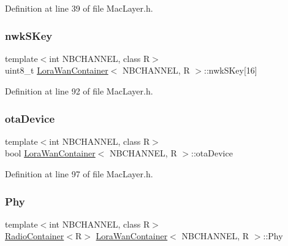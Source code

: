 Definition at line 39 of file Mac\+Layer.\+h.

\mbox{\label{class_lora_wan_container_a93c94009fe081053ce73e0b10e05625b}} 
\subsubsection{\texorpdfstring{nwk\+S\+Key}{nwkSKey}}
{\footnotesize\ttfamily template$<$int N\+B\+C\+H\+A\+N\+N\+EL, class R$>$ \\
uint8\+\_\+t \mbox{\hyperlink{class_lora_wan_container}{Lora\+Wan\+Container}}$<$ N\+B\+C\+H\+A\+N\+N\+EL, R $>$\+::nwk\+S\+Key\mbox{[}16\mbox{]}}



Definition at line 92 of file Mac\+Layer.\+h.

\mbox{\label{class_lora_wan_container_a41cc43d7525d3c7fca17d06261d3f1f3}} 
\subsubsection{\texorpdfstring{ota\+Device}{otaDevice}}
{\footnotesize\ttfamily template$<$int N\+B\+C\+H\+A\+N\+N\+EL, class R$>$ \\
bool \mbox{\hyperlink{class_lora_wan_container}{Lora\+Wan\+Container}}$<$ N\+B\+C\+H\+A\+N\+N\+EL, R $>$\+::ota\+Device}



Definition at line 97 of file Mac\+Layer.\+h.

\mbox{\label{class_lora_wan_container_a022c395b2c5a3829c14168a52a187a61}} 
\subsubsection{\texorpdfstring{Phy}{Phy}}
{\footnotesize\ttfamily template$<$int N\+B\+C\+H\+A\+N\+N\+EL, class R$>$ \\
\mbox{\hyperlink{class_radio_container}{Radio\+Container}}$<$R$>$ \mbox{\hyperlink{class_lora_wan_container}{Lora\+Wan\+Container}}$<$ N\+B\+C\+H\+A\+N\+N\+EL, R $>$\+::Phy}



